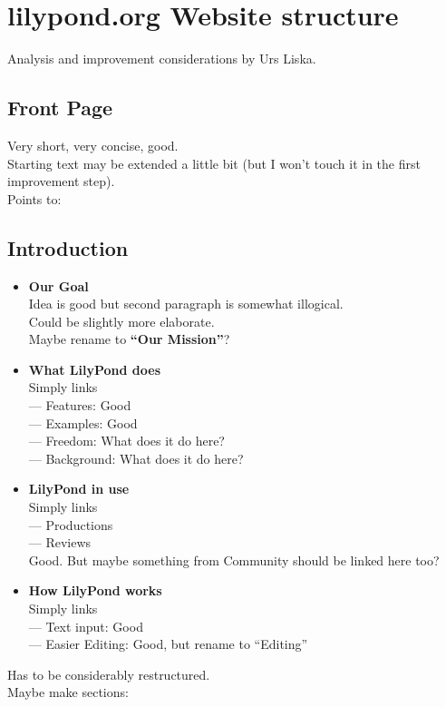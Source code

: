 \documentclass[10pt,a4paper,]{article}
\begin{document}
\section*{lilypond.org Website structure}

Analysis and improvement considerations by Urs Liska.

\subsection*{Front Page}
Very short, very concise, good.\\
Starting text may be extended a little bit (but I won't touch it in the first improvement step).\\
Points to:

\subsection*{Introduction}
	\begin{itemize}
	\item \textbf{Our Goal}\\
		Idea is good but second paragraph is somewhat illogical.\\
		Could be slightly more elaborate.\\
		Maybe rename to \textbf{“Our Mission”}?
	\item\textbf{What LilyPond does}\\
		Simply links\\
		--- Features: Good\\
		--- Examples: Good\\
		--- Freedom: What does it do here?\\
		--- Background: What does it do here?
	\item \textbf{LilyPond in use}\\
		Simply links\\
		--- Productions\\
		--- Reviews\\
		Good. But maybe something from Community should be linked here too?
	\item \textbf{How LilyPond works}\\
		Simply links\\
		--- Text input: Good\\
		--- Easier Editing: Good, but rename to “Editing”
	\end{itemize}
	Has to be considerably restructured.\\
	Maybe make sections:\\
\end{document}
